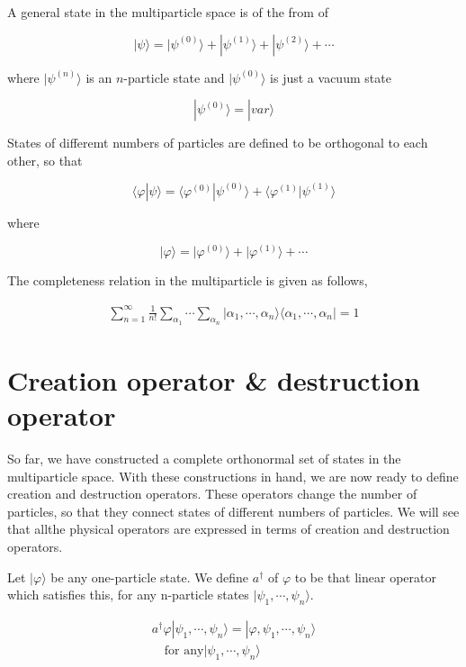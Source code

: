 A general state in the multiparticle space is of the from of 

\[|\psi\rangle = |\psi^{(0)}\rangle + |\psi^{(1)}\rangle + |\psi^{(2)}\rangle + \cdots \]

where $|\psi^{(n)}\rangle$ is an $n$-particle state and $|\psi^{(0)}\rangle$ is just a vacuum state

\[|\psi^{(0)}\rangle = |var\rangle \]

States of differemt numbers of particles are defined to be orthogonal to each other, so that

\[\langle\varphi|\psi\rangle = \langle\varphi^{(0)}|\psi^{(0)}\rangle + \langle\varphi^{(1)}|\psi^{(1)}\rangle  \]

where

\[|\varphi\rangle = |\varphi^{(0)}\rangle + |\varphi^{(1)}\rangle + \cdots \]

The completeness relation in the multiparticle is given as follows, 

\begin{align}
\sum_{n=1}^{\infty}\frac{1}{n!}\sum_{\alpha_1}\cdots\sum_{\alpha_n}|\alpha_1,\cdots,\alpha_n\rangle\langle \alpha_1,\cdots,\alpha_n| = 1
\end{align}



\section{Creation operator \& destruction operator}

So far, we have constructed a complete orthonormal set of states in the multiparticle space. With these constructions in hand, we are now ready to define creation and destruction operators. These operators change the number of particles, so that they connect states of different numbers of particles. We will see that allthe physical operators are expressed in terms of creation and destruction operators. 

Let $|\varphi\rangle$ be any one-particle state. We define $a^\dagger$ of $\varphi$ to be that linear operator which satisfies this, for any n-particle states $|\psi_1, \cdots,\psi_n\rangle$. 

\begin{align}
a^\dagger{\varphi}|\psi_1,\cdots,\psi_n\rangle = |\varphi,\psi_1,\cdots,\psi_n\rangle \tag{e}\\
\quad\text{for any}|\psi_1,\cdots,\psi_n\rangle \label{Eqs1.6.1}
\end{align}

